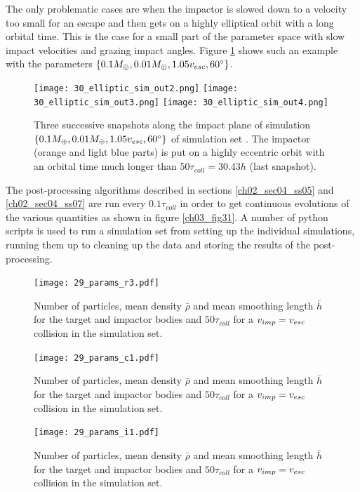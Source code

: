 The only problematic cases are when the impactor is slowed down to a velocity too small for an escape and then gets on a highly elliptical orbit with a long orbital time. This is the case for a small part of the parameter space with slow impact velocities and grazing impact angles. Figure \ref{ch03_fig30} shows such an example with the parameters $\{0.1 M_{\oplus}, 0.01 M_{\oplus}, 1.05 v_{esc}, 60 ^\circ \}$.
\begin{figure}[htbp]
\begin{center}
\texttt{[image: 30\_elliptic\_sim\_out2.png]}
\texttt{[image: 30\_elliptic\_sim\_out3.png]}
\texttt{[image: 30\_elliptic\_sim\_out4.png]}
\caption{Three successive snapshots along the impact plane of simulation $\{0.1 M_{\oplus}, 0.01 M_{\oplus}, 1.05 v_{esc}, 60 ^\circ \}$ of simulation set \css. The impactor (orange and light blue parts) is put on a highly eccentric orbit with an orbital time much longer than $50 \tau_{coll} = 30.43h$ (last snapshot).}
\label{ch03_fig30}
\end{center}
\end{figure}

The post-processing algorithms described in sections \ref{ch02_sec04_ss05} and \ref{ch02_sec04_ss07} are run every $0.1 \tau_{coll}$ in order to get continuous evolutions of the various quantities as shown in figure \ref{ch03_fig31}. A number of python scripts is used to run a simulation set from setting up the individual simulations, running them up to cleaning up the data and storing the results of the post-processing.

\begin{landscape}
\begin{figure}[htbp]
\begin{center}
\texttt{[image: 29\_params\_r3.pdf]}
\caption{Number of particles, mean density $\bar{\rho}$ and mean smoothing length $\bar{h}$ for the target and impactor bodies and $50 \tau_{coll}$ for a $v_{imp} = v_{esc}$ collision in the \rss simulation set.}
\label{ch03_fig29a}
\end{center}
\end{figure}
\begin{figure}[htbp]

\begin{center}
\texttt{[image: 29\_params\_c1.pdf]}
\caption{Number of particles, mean density $\bar{\rho}$ and mean smoothing length $\bar{h}$ for the target and impactor bodies and $50 \tau_{coll}$ for a $v_{imp} = v_{esc}$ collision in the \css simulation set.}
\label{ch03_fig29b}
\end{center}
\end{figure}

\begin{figure}[htbp]
\begin{center}
\texttt{[image: 29\_params\_i1.pdf]}
\caption{Number of particles, mean density $\bar{\rho}$ and mean smoothing length $\bar{h}$ for the target and impactor bodies and $50 \tau_{coll}$ for a $v_{imp} = v_{esc}$ collision in the \iss simulation set.}
\label{ch03_fig29c}
\end{center}
\end{figure}
\end{landscape}


